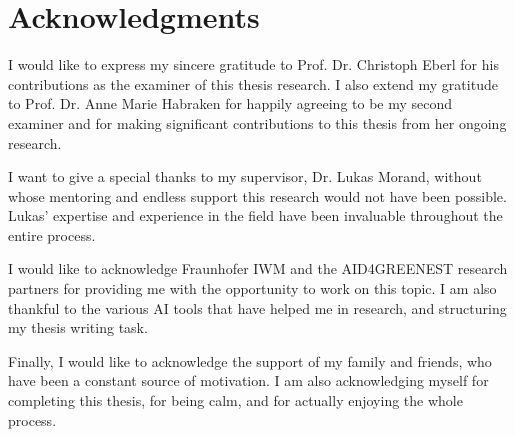 \documentclass[class=scrbook, crop=false]{standalone}
\begin{document}
\chapter{Acknowledgments}
\label{Chapter: Acknowledgments}

I would like to express my sincere gratitude to Prof. Dr. Christoph Eberl for his contributions as the examiner of this thesis research. I also extend my gratitude to Prof. Dr. Anne Marie Habraken for happily agreeing to be my second examiner and for making significant contributions to this thesis from her ongoing research.

I want to give a special thanks to my supervisor, Dr. Lukas Morand, without whose mentoring and endless support this research would not have been possible. Lukas' expertise and experience in the field have been invaluable throughout the entire process.

I would like to acknowledge Fraunhofer IWM and the AID4GREENEST research partners for providing me with the opportunity to work on this topic. I am also thankful to the various AI tools that have helped me in research, and structuring my thesis writing task.

Finally, I would like to acknowledge the support of my family and friends, who have been a constant source of motivation. I am also acknowledging myself for completing this thesis, for being calm, and for actually enjoying the whole process.
\end{document}
